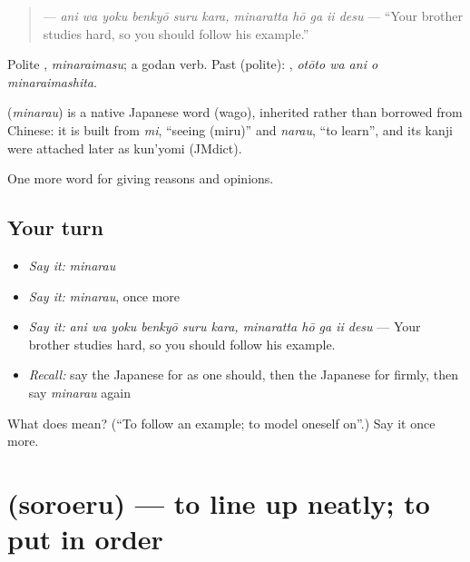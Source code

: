 \begin{quote}
\textbf{    } — \emph{ani wa yoku benkyō suru kara, minaratta hō ga ii desu} — \textquotedblleft{}Your brother studies hard, so you should follow his example.\textquotedblright{}
\end{quote}

Polite \textbf{}, \emph{minaraimasu}; a godan verb. Past (polite): \textbf{  }, \emph{otōto wa ani o minaraimashita}.

\begin{cousinweb}
\textbf{} (\emph{minarau}) is a native Japanese word (wago), inherited rather than borrowed from Chinese: it is built from \emph{mi}, \textquotedblleft{}seeing (miru)\textquotedblright{} and \emph{narau}, \textquotedblleft{}to learn\textquotedblright{}, and its kanji were attached later as kun'yomi (JMdict).
\end{cousinweb}

\begin{grammarlens}[title={What you've built}]
One more word for giving reasons and opinions.
\end{grammarlens}

\subsection*{Your turn}
\begin{itemize}
\raggedright
  \item \emph{Say it:} \emph{minarau}
  \item \emph{Say it:} \emph{minarau}, once more
  \item \emph{Say it:} \emph{ani wa yoku benkyō suru kara, minaratta hō ga ii desu} — Your brother studies hard, so you should follow his example.
  \item \emph{Recall:} say the Japanese for as one should, then the Japanese for firmly, then say \emph{minarau} again
\end{itemize}

\begin{tcolorbox}[breakable,colback=teal!4,colframe=teal!35!black,title={Before you move on}]
What does  mean? (\textquotedblleft{}To follow an example; to model oneself on\textquotedblright{}.) Say it once more.
\end{tcolorbox}
\section[\texorpdfstring{\ja{そろえる} (soroeru)}{そろえる (soroeru)}]{ (soroeru) — to line up neatly; to put in order}

